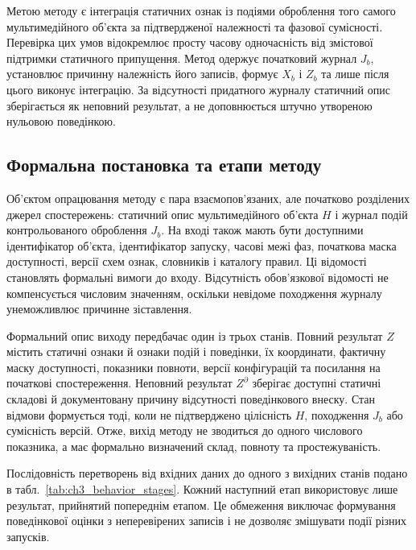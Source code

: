 Метою методу є інтеграція статичних ознак із подіями оброблення того самого мультимедійного об’єкта за підтвердженої належності та фазової сумісності. Перевірка цих умов відокремлює просту часову одночасність від змістової підтримки статичного припущення. Метод одержує початковий журнал $J_b$, установлює причинну належність його записів, формує $X_b$ і $Z_b$ та лише після цього виконує інтеграцію. За відсутності придатного журналу статичний опис зберігається як неповний результат, а не доповнюється штучно утвореною нульовою поведінкою.

\subsection{Формальна постановка та етапи методу}

Об’єктом опрацювання методу є пара взаємопов’язаних, але початково розділених джерел спостережень: статичний опис мультимедійного об’єкта $H$ і журнал подій контрольованого оброблення $J_b$. На вході також мають бути доступними ідентифікатор об’єкта, ідентифікатор запуску, часові межі фаз, початкова маска доступності, версії схем ознак, словників і каталогу правил. Ці відомості становлять формальні вимоги до входу. Відсутність обов’язкової відомості не компенсується числовим значенням, оскільки невідоме походження журналу унеможливлює причинне зіставлення.

Формальний опис виходу передбачає один із трьох станів. Повний результат $Z$ містить статичні ознаки й ознаки подій і поведінки, їх координати, фактичну маску доступності, показники повноти, версії конфігурацій та посилання на початкові спостереження. Неповний результат $Z^{\partial}$ зберігає доступні статичні складові й документовану причину відсутності поведінкового внеску. Стан відмови формується тоді, коли не підтверджено цілісність $H$, походження $J_b$ або сумісність версій. Отже, вихід методу не зводиться до одного числового показника, а має формально визначений склад, повноту та простежуваність.

Послідовність перетворень від вхідних даних до одного з вихідних станів подано в табл.~\ref{tab:ch3_behavior_stages}. Кожний наступний етап використовує лише результат, прийнятий попереднім етапом. Це обмеження виключає формування поведінкової оцінки з неперевірених записів і не дозволяє змішувати події різних запусків.

